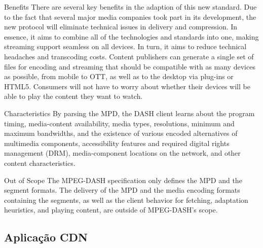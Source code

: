 Benefits
There are several key benefits in the adaption of this new standard. Due to the fact that several major media companies took part in its development, the new protocol will eliminate technical issues in delivery and compression. In essence, it aims to combine all of the technologies and standards into one, making streaming support seamless on all devices. In turn, it aims to reduce technical headaches and transcoding costs. Content publishers can generate a single set of files for encoding and streaming that should be compatible with as many devices as possible, from mobile to OTT, as well as to the desktop via plug-ins or HTML5. Consumers will not have to worry about whether their devices will be able to play the content they want to watch.

Characteristics
By parsing the MPD, the DASH client learns about the program timing, media-content availability, media types, resolutions, minimum and maximum bandwidths, and the existence of various encoded alternatives of multimedia components, accessibility features and required digital rights management (DRM), media-component locations on the network, and other content characteristics. 

Out of Scope
The MPEG-DASH specification only defines the MPD and the segment formats. The delivery of the MPD and the media encoding formats containing the segments, as well as the client behavior for fetching, adaptation heuristics, and playing content, are outside of MPEG-DASH’s scope.


\subsection{Aplicação CDN }